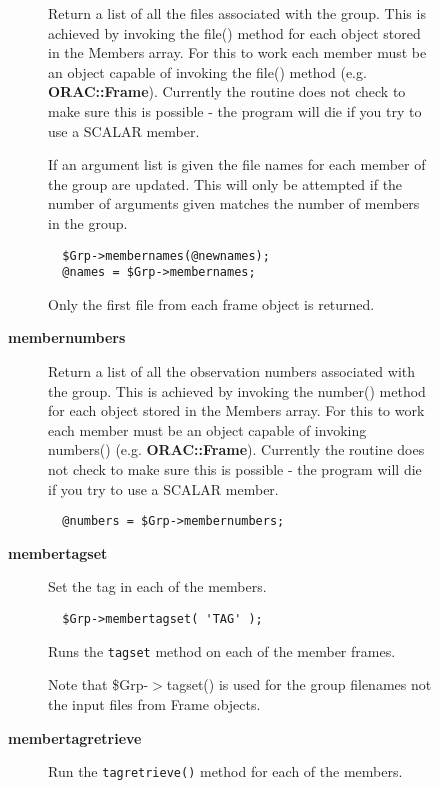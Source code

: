 \begin{description}
\begin{description}
\begin{description}
Return a list of all the files associated with the group. This is
achieved by invoking the file() method for each object stored in the
Members array.  For this to work each member must be an object capable
of invoking the file() method (e.g. \textbf{ORAC::Frame}). Currently the
routine does not check to make sure this is possible - the program
will die if you try to use a SCALAR member.



If an argument list is given the file names for each member of the
group are updated. This will only be attempted if the number of
arguments given matches the number of members in the group.

\begin{verbatim}
  $Grp->membernames(@newnames);
  @names = $Grp->membernames;
\end{verbatim}


Only the first file from each frame object is returned.


\item[{\textbf{membernumbers}}] \mbox{}

Return a list of all the observation numbers associated with
the group. This is achieved by invoking the number() method for
each object stored in the Members array.
For this to work each member must be an object capable of invoking
numbers() (e.g. \textbf{ORAC::Frame}). Currently the routine does not check
to make sure this is possible - the program will die if you try
to use a SCALAR member.

\begin{verbatim}
  @numbers = $Grp->membernumbers;
\end{verbatim}

\item[{\textbf{membertagset}}] \mbox{}

Set the tag in each of the members.

\begin{verbatim}
  $Grp->membertagset( 'TAG' );
\end{verbatim}


Runs the \texttt{tagset} method on each of the member frames.



Note that \$Grp-$>$tagset() is used for the group filenames
not the input files from Frame objects.


\item[{\textbf{membertagretrieve}}] \mbox{}

Run the \texttt{tagretrieve()} method for each of the members.


\end{description}
\end{description}
\end{description}
